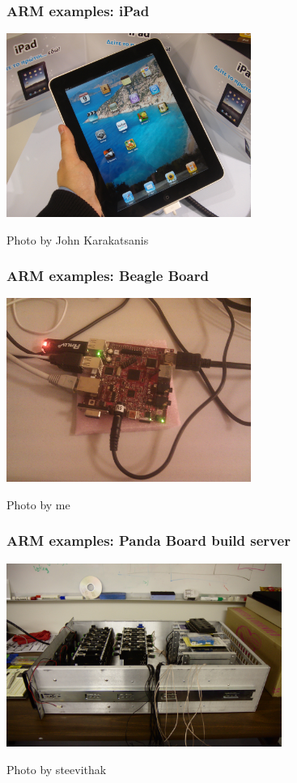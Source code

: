 \documentclass{beamer}
\begin{document}
\begin{frame}[t]
\frametitle{ARM examples: iPad}
\begin{center}
\includegraphics[height=6cm]{iPad.jpg}

{\scriptsize Photo by John Karakatsanis}
\end{center}
\end{frame}

\begin{frame}[t]
\frametitle{ARM examples: Beagle Board}
\begin{center}
\includegraphics[height=6cm]{Beagle.jpg}

{\scriptsize Photo by me}
\end{center}
\end{frame}

\begin{frame}[t]
\frametitle{ARM examples: Panda Board build server}
\begin{center}
\includegraphics[height=6cm]{server.jpg}

{\scriptsize Photo by steevithak}
\end{center}
\end{frame}
\end{document}
